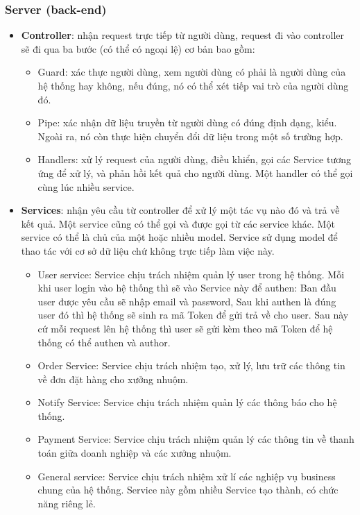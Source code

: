 \subsubsection{Server (back-end)}
\begin{itemize}
    \item \textbf{Controller}: nhận request trực tiếp từ người dùng, request đi vào controller sẽ đi qua ba bước (có thể có ngoại lệ) cơ bản bao gồm:
    \begin{itemize}
        \item Guard: xác thực người dùng, xem người dùng có phải là người dùng của hệ thống hay không, nếu đúng, nó có thể xét tiếp vai trò của người dùng đó.
        \item Pipe: xác nhận dữ liệu truyền từ người dùng có đúng định dạng, kiểu. Ngoài ra, nó còn thực hiện chuyển đổi dữ liệu trong một số trường hợp.
        \item Handlers: xử lý request của người dùng, điều khiển, gọi các Service tương ứng để xử lý, và phản hồi kết quả cho người dùng. Một handler có thể gọi cùng lúc nhiều service.
    \end{itemize}
    
    \item \textbf{Services}: nhận yêu cầu từ controller để xử lý một tác vụ nào đó và trả về kết quả. Một service cũng có thể gọi và được gọi từ các service khác. Một service có thể là chủ của một hoặc nhiều model. Service sử dụng model để thao tác với cơ sở dữ liệu chứ không trực tiếp làm việc này.
    \begin{itemize}
        \item User service: Service chịu trách nhiệm quản lý user trong hệ thống. Mỗi khi user login vào hệ thống thì sẽ vào Service này để authen: Ban đầu user được yêu cầu sẽ nhập email và password, Sau khi authen là đúng user đó thì hệ thống sẽ sinh ra mã Token để gửi trả về cho user. Sau này cứ mỗi request lên hệ thống thì user sẽ gửi kèm theo mã Token để hệ thống có thể authen và author.
        \item Order Service: Service chịu trách nhiệm tạo, xử lý, lưu trữ các thông tin về đơn đặt hàng cho xưởng nhuộm.
        \item Notify Service: Service chịu trách nhiệm quản lý các thông báo cho hệ thống.
        \item Payment Service: Service chịu trách nhiệm quản lý các thông tin về thanh toán giữa doanh nghiệp và các xưởng nhuộm.
        \item General service: Service chịu trách nhiệm xử lí các nghiệp vụ business chung của hệ thống. Service này gồm nhiều Service tạo thành, có chức năng riêng lẻ.
    \end{itemize}
    

\end{itemize}
